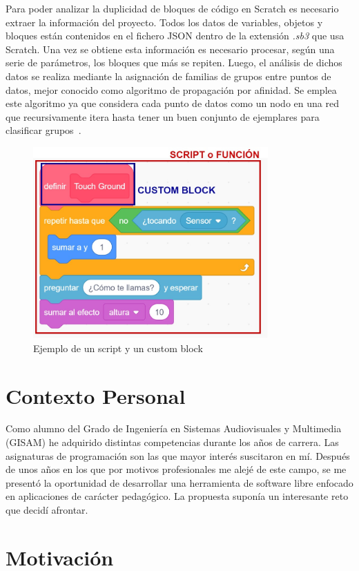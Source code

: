 \documentclass[a4paper, 12pt]{book}
\begin{document}
Para poder analizar la duplicidad de bloques de código en Scratch es necesario extraer la información del proyecto. Todos los datos de variables, objetos y bloques están contenidos en el fichero JSON dentro de la extensión \emph{.sb3} que usa Scratch. Una vez se obtiene esta información es necesario procesar, según una serie de parámetros, los bloques que más se repiten. Luego, el análisis de dichos datos se realiza mediante la asignación de familias de grupos entre puntos de datos, mejor conocido como algoritmo de propagación por afinidad. Se emplea este algoritmo ya que considera cada punto de datos como un nodo en una red que recursivamente itera hasta tener un buen conjunto de ejemplares para clasificar grupos~\cite{clusteringpaper}.

\begin{figure}[htb!]
	\centering
    \includegraphics[width=9cm, keepaspectratio]{img/script.jpg}
    \caption{Ejemplo de un script y un custom block}
    \label{fig:script}
\end{figure}

\section{Contexto Personal}
\label{sec:contexto}

Como alumno del Grado de Ingeniería en Sistemas Audiovisuales y Multimedia (GISAM) he adquirido distintas competencias durante los años de carrera. Las asignaturas de programación son las que mayor interés suscitaron en mí. Después de unos años en los que por motivos profesionales me alejé de este campo, se me presentó la oportunidad de desarrollar una herramienta de software libre enfocado en aplicaciones de carácter pedagógico. La propuesta suponía un interesante reto que decidí afrontar. 

\section{Motivación}
\label{sec:motivacion}
\end{document}
